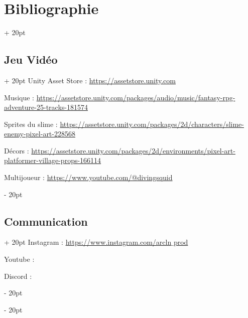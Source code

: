 \documentclass[a4paper, 12pt, twoside]{article}
\newcommand{\ind}[1][20pt]{\advance\leftskip + #1}
\newcommand{\deind}[1][20pt]{\advance\leftskip - #1}
\newenvironment{indt}[2][20pt]{#2 \par \ind[#1]}{\par \deind} %
\begin{document}
    \begin{indt}{\section{Bibliographie}}

        \begin{indt}{\subsection{Jeu Vidéo}}
            Unity Asset Store : \href{url}{https://assetstore.unity.com}
            
            Musique : \href{url}{https://assetstore.unity.com/packages/audio/music/fantasy-rpg-adventure-25-tracks-181574}

            Sprites du slime : \href{url}{https://assetstore.unity.com/packages/2d/characters/slime-enemy-pixel-art-228568}

            Décors : \href{url}{https://assetstore.unity.com/packages/2d/environments/pixel-art-platformer-village-props-166114}
        
            Multijoueur : \href{url}{https://www.youtube.com/@divingsquid}


        \end{indt}

        \begin{indt}{\subsection{Communication}}
            Instagram : \href{url}{https://www.instagram.com/arcln$\_$prod}

            Youtube :

            Discord :
        \end{indt}
    \end{indt}
\end{document}
